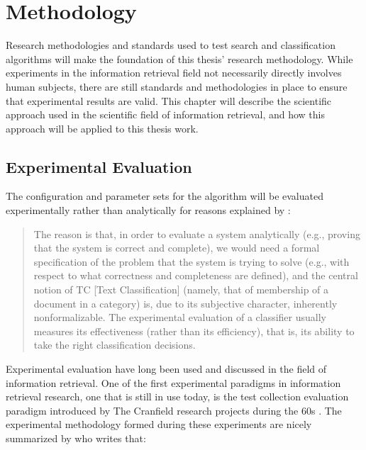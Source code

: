 
\chapter{Methodology} %

\label{Methodology} %


Research methodologies and standards used to test search and classification algorithms will make the foundation of this thesis' research methodology. While experiments in the information retrieval field not necessarily directly involves human subjects, there are still standards and methodologies in place to ensure that experimental results are valid. This chapter will describe the scientific approach used in the scientific field of information retrieval, and how this approach will be applied to this thesis work.

\section{Experimental Evaluation}
\label{ExperimentalEvaluation}
The configuration and parameter sets for the \CTC algorithm will be evaluated experimentally rather than analytically for reasons explained by \cite[p. 32]{Sebastiani2002}:
\begin{quote}The reason is that, in order to evaluate a system analytically (e.g., proving that the system is correct and complete), we would need a formal specification of the problem that the system is trying to solve (e.g., with respect to what correctness and completeness are defined), and the central notion of TC [Text Classification] (namely, that of membership of a document in a category) is, due to its subjective character, inherently nonformalizable. The experimental evaluation of a classifier usually measures its effectiveness (rather than its efficiency), that is, its ability to take the right classification decisions.
\end{quote}

Experimental evaluation have long been used and discussed in the field of information retrieval. One of the first experimental paradigms in information retrieval research, one that is still in use today, is the test collection evaluation paradigm introduced by The Cranfield research projects during the 60s \cite{Cleverdon1966}. The experimental methodology formed during these experiments are nicely summarized by \cite[p. 564]{Voorhees2005} who writes that:

